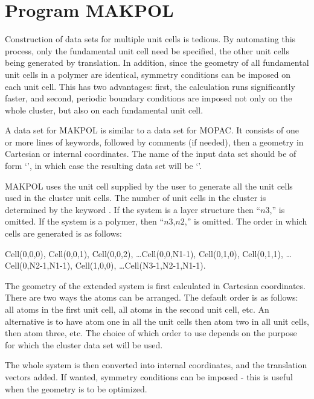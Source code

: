 \chapter{Program MAKPOL}
Construction of data sets for multiple unit cells is  tedious.  By automating
this process, only the fundamental unit  cell need be specified, the other unit
cells being generated  by translation.  In addition, since the geometry of all 
fundamental unit cells in a polymer are identical, symmetry  conditions can be
imposed on each unit cell.  This has two  advantages: first, the calculation
runs significantly faster, and   second,
periodic boundary conditions are imposed not only on the  whole cluster, but
also on each fundamental unit cell.  

A data set for MAKPOL is similar to a data set for MOPAC.  It consists of one
or more lines of keywords, followed by comments (if needed), then a geometry in
Cartesian or internal coordinates.  The name of the input data set should be of
form `', in which case the resulting data set
will be `'.


MAKPOL uses the unit cell supplied by the user to generate all the unit cells
used in the cluster unit cells. \label{makpol:mers} The number of unit cells in
the cluster is determined by the keyword .  If the
system is a layer structure then ``$n3$,'' is omitted. If the system is a
polymer, then ``$n3$,$n2$,'' is omitted. The order in which cells are generated
is as follows:
\begin{sloppypar}
Cell(0,0,0), Cell(0,0,1), Cell(0,0,2), \ldots Cell(0,0,N1-1),
Cell(0,1,0), Cell(0,1,1), \ldots Cell(0,N2-1,N1-1), Cell(1,0,0),
\ldots Cell(N3-1,N2-1,N1-1).
\end{sloppypar}

The geometry of the extended system is first calculated in Cartesian
coordinates. There are two ways the atoms can be arranged.  The default order
is as follows: all atoms in the first unit cell, all atoms in the second unit
cell, etc.  An alternative is to have atom one in all the unit cells then atom
two in all  unit cells, then atom three, etc.  The choice of which order to use
depends on the purpose for which the cluster data set will be used.

The whole system is then converted into internal coordinates, and the 
translation vectors added.   If wanted, symmetry conditions can be imposed -
this is useful when the geometry is to be optimized.

